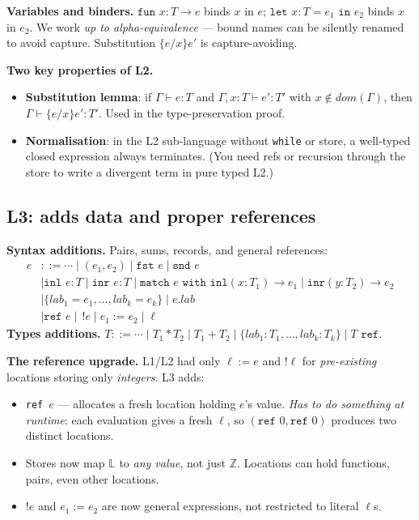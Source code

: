 \documentclass[11pt,a4paper]{article}
\begin{document}
\textbf{Variables and binders.} $\texttt{fun } x{:}T \to e$ binds $x$ in $e$; $\texttt{let } x{:}T = e_1 \texttt{ in } e_2$ binds $x$ in $e_2$. We work \emph{up to alpha-equivalence} --- bound names can be silently renamed to avoid capture. Substitution $\{e/x\}e'$ is capture-avoiding.

\textbf{Two key properties of L2.}
\begin{itemize}[leftmargin=*,itemsep=1pt]
  \item \textbf{Substitution lemma}: if $\Gamma \vdash e{:}T$ and $\Gamma, x{:}T \vdash e'{:}T'$ with $x \notin \mathit{dom}(\Gamma)$, then $\Gamma \vdash \{e/x\}e' {:} T'$. Used in the type-preservation proof.
  \item \textbf{Normalisation}: in the L2 sub-language without \texttt{while} or store, a well-typed closed expression always terminates. (You need refs or recursion through the store to write a divergent term in pure typed L2.)
\end{itemize}

\subsection{L3: adds data and proper references}

\textbf{Syntax additions.} Pairs, sums, records, and general references:
\begin{align*}
e &::= \cdots \mid (e_1, e_2) \mid \texttt{fst } e \mid \texttt{snd } e \\
  &\mid \texttt{inl } e{:}T \mid \texttt{inr } e{:}T \mid \texttt{match } e \texttt{ with inl}(x{:}T_1) \to e_1 \mid \texttt{inr}(y{:}T_2) \to e_2 \\
  &\mid \{\mathit{lab}_1 = e_1, \ldots, \mathit{lab}_k = e_k\} \mid e.\mathit{lab} \\
  &\mid \texttt{ref } e \mid \,!e \mid e_1 := e_2 \mid \ell
\end{align*}
\textbf{Types additions.} $T ::= \cdots \mid T_1 * T_2 \mid T_1 + T_2 \mid \{\mathit{lab}_1{:}T_1, \ldots, \mathit{lab}_k{:}T_k\} \mid T \texttt{ ref}$.

\textbf{The reference upgrade.} L1/L2 had only $\ell := e$ and $!\ell$ for \emph{pre-existing} locations storing only \emph{integers}. L3 adds:
\begin{itemize}[leftmargin=*,itemsep=1pt]
  \item \texttt{ref}~$e$ --- allocates a fresh location holding $e$'s value. \emph{Has to do something at runtime}: each evaluation gives a fresh $\ell$, so $(\texttt{ref } 0, \texttt{ref } 0)$ produces two distinct locations.
  \item Stores now map $\mathbb{L}$ to \emph{any value}, not just $\mathbb{Z}$. Locations can hold functions, pairs, even other locations.
  \item $!e$ and $e_1 := e_2$ are now general expressions, not restricted to literal $\ell$s.
\end{itemize}
\end{document}
